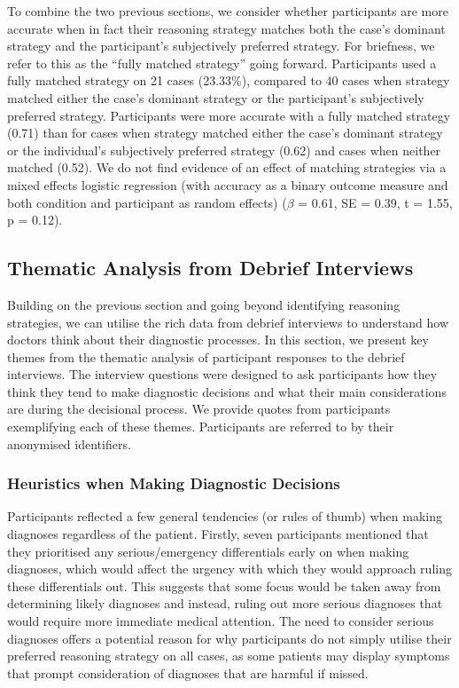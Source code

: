 \documentclass[a4paper, nobind]{templates/ociamthesis}
\begin{document}
To combine the two previous sections, we consider whether participants are more accurate when in fact their reasoning strategy matches both the case's dominant strategy and the participant's subjectively preferred strategy. For briefness, we refer to this as the ``fully matched strategy'' going forward. Participants used a fully matched strategy on 21 cases (23.33\%), compared to 40 cases when strategy matched either the case's dominant strategy or the participant's subjectively preferred strategy. Participants were more accurate with a fully matched strategy (0.71) than for cases when strategy matched either the case's dominant strategy or the individual's subjectively preferred strategy (0.62) and cases when neither matched (0.52). We do not find evidence of an effect of matching strategies via a mixed effects logistic regression (with accuracy as a binary outcome measure and both condition and participant as random effects) (\(\beta\) = 0.61, SE = 0.39, t = 1.55, p = 0.12).

\subsection{Thematic Analysis from Debrief Interviews}\label{thematic-analysis-from-debrief-interviews}

Building on the previous section and going beyond identifying reasoning strategies, we can utilise the rich data from debrief interviews to understand how doctors think about their diagnostic processes. In this section, we present key themes from the thematic analysis of participant responses to the debrief interviews. The interview questions were designed to ask participants how they think they tend to make diagnostic decisions and what their main considerations are during the decisional process. We provide quotes from participants exemplifying each of these themes. Participants are referred to by their anonymised identifiers.

\subsubsection{Heuristics when Making Diagnostic Decisions}\label{heuristics-when-making-diagnostic-decisions}

Participants reflected a few general tendencies (or rules of thumb) when making diagnoses regardless of the patient. Firstly, seven participants mentioned that they prioritised any serious/emergency differentials early on when making diagnoses, which would affect the urgency with which they would approach ruling these differentials out. This suggests that some focus would be taken away from determining likely diagnoses and instead, ruling out more serious diagnoses that would require more immediate medical attention. The need to consider serious diagnoses offers a potential reason for why participants do not simply utilise their preferred reasoning strategy on all cases, as some patients may display symptoms that prompt consideration of diagnoses that are harmful if missed.\\
\end{document}
